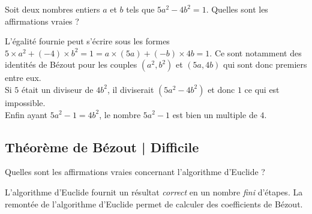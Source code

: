 \begin{question}
 Soit deux nombres entiers $a$ et $b$ tels que $5a^2 - 4b^2 = 1$. Quelles sont les affirmations vraies ?
    \begin{answers} 
    \end{answers}
    \begin{explanations} 
    L'égalité fournie peut s'écrire sous les formes $5 \times a^2 + (-4) \times b^2 = 1 = a \times (5a) + (-b) \times 4b = 1$. Ce sont notamment des identités de Bézout pour les couples $(a^2,b^2)$ et $(5a,4b)$ qui sont donc premiers entre eux.\\
    Si $5$ était un diviseur de $4b^2$, il diviserait $(5a^2 - 4b^2)$ et donc $1$ ce qui est impossible.\\
    Enfin ayant $5a^2 - 1 = 4 b^2$, le nombre $5a^2-1$ est bien un multiple de $4$.
    \end{explanations}
\end{question}


\subsection{Théorème de Bézout | Difficile}


\begin{question}
    Quelles sont les affirmations vraies concernant l'algorithme d'Euclide ?
    \begin{answers} 
    \end{answers}
    \begin{explanations}
        L'algorithme d'Euclide fournit un résultat \emph{correct} en un nombre \emph{fini} d'étapes. La remontée de l'algorithme d'Euclide permet de calculer des coefficients de Bézout.
    \end{explanations}
\end{question}


